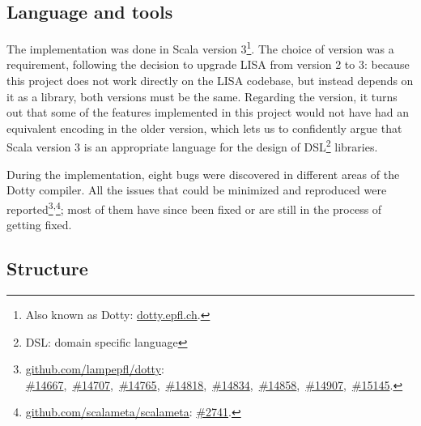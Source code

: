 \subsection{Language and tools}

The implementation was done in Scala version 3\footnote{Also known as Dotty: \href{https://dotty.epfl.ch}{dotty.epfl.ch}.}. The choice of version was a requirement, following the decision to upgrade LISA from version 2 to 3: because this project does not work directly on the LISA codebase, but instead depends on it as a library, both versions must be the same. Regarding the version, it turns out that some of the features implemented in this project would not have had an equivalent encoding in the older version, which lets us to confidently argue that Scala version 3 is an appropriate language for the design of DSL\footnote{DSL: domain specific language} libraries.

During the implementation, eight bugs were discovered in different areas of the Dotty compiler. All the issues that could be minimized and reproduced were reported\footnote{
\href{https://github.com/lampepfl/dotty}{github.com/lampepfl/dotty}:
\href{https://github.com/lampepfl/dotty/issues/14667}{\#14667},\
\href{https://github.com/lampepfl/dotty/issues/14707}{\#14707},\
\href{https://github.com/lampepfl/dotty/issues/14765}{\#14765},\
\href{https://github.com/lampepfl/dotty/issues/14818}{\#14818},\
\href{https://github.com/lampepfl/dotty/issues/14834}{\#14834},\
\href{https://github.com/lampepfl/dotty/issues/14858}{\#14858},\
\href{https://github.com/lampepfl/dotty/issues/14907}{\#14907},\
\href{https://github.com/lampepfl/dotty/issues/15145}{\#15145}.
}\textsuperscript{,}\footnote{
\href{https://github.com/scalameta/scalameta}{github.com/scalameta/scalameta}:
\href{https://github.com/scalameta/scalameta/issues/2741}{\#2741}.
}; most of them have since been fixed or are still in the process of getting fixed.

\subsection{Structure}

